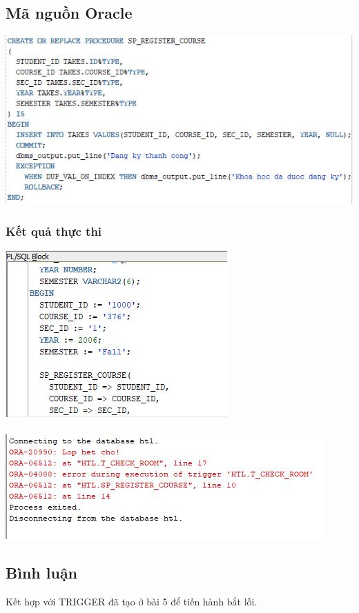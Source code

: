 \documentclass[12pt,a4paper]{report}
\begin{document}
\subsection{Mã nguồn Oracle}
\includegraphics[scale=1]{b9o}
\subsubsection{Kết quả thực thi}
\includegraphics[scale=1]{kb91}\\\\
\includegraphics[scale=1]{kb92}
\subsection{Bình luận}
Kết hợp với TRIGGER đã tạo ở bài 5 để tiến hành bắt lỗi.
\end{document}
